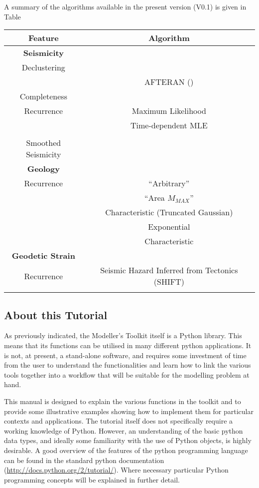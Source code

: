 A summary of the algorithms available in the present version (V0.1) is given in Table 
\begin{table}
\begin{tabular}{|c|c|} \hline
Feature & Algorithm\\ \hline
\textbf{Seismicity} & \\ \hline
Declustering & \cite{GardnerKnopoff1974}  \\
    & AFTERAN (\cite{Musson1999}) \\ \hline
Completeness & \cite{Stepp1971}\\ \hline
Recurrence & Maximum Likelihood \cite{Aki1965}\\
 & Time-dependent MLE\\
 & \cite{Weichert1980}\\ \hline
 Smoothed Seismicity & \cite{frankel1995} \\ \hline
 \textbf{Geology} & \\ \hline
 Recurrence & \cite{AndersonLuco1983} ``Arbitrary''\\
  & \cite{AndersonLuco1983} ``Area $M_{MAX}$''\\
  & Characteristic (Truncated Gaussian) \\
  & \cite{YoungsCoppersmith1985} Exponential\\
  & \cite{YoungsCoppersmith1985} Characteristic\\ \hline
 \textbf{Geodetic Strain} & \\ \hline
 Recurrence & Seismic Hazard Inferred from Tectonics (SHIFT) \\
           &  \cite{BirdLiu2007, Bird_etal2010} \\ \hline
\end{tabular}
\end{table}

\subsection{About this Tutorial}

As previously indicated, the Modeller's Toolkit itself is a Python library. This means that its functions can be utilised in many different python applications. It is not, at present, a stand-alone software, and requires some investment of time from the user to understand the functionalities and learn how to link the various tools together into a workflow that will be suitable for the modelling problem at hand.

This manual is designed to explain the various functions in the toolkit and to provide some illustrative examples showing how to implement them for particular contexts and applications. The tutorial itself does not specifically require a working knowledge of Python. However, an understanding of the basic python data types, and ideally some familiarity with the use of Python objects, is highly desirable. A good overview of the features of the python programming language can be found in the standard python documentation (\href{http://docs.python.org/2/tutorial/}{http://docs.python.org/2/tutorial/}). Where necessary particular Python programming concepts will be explained in further detail.

